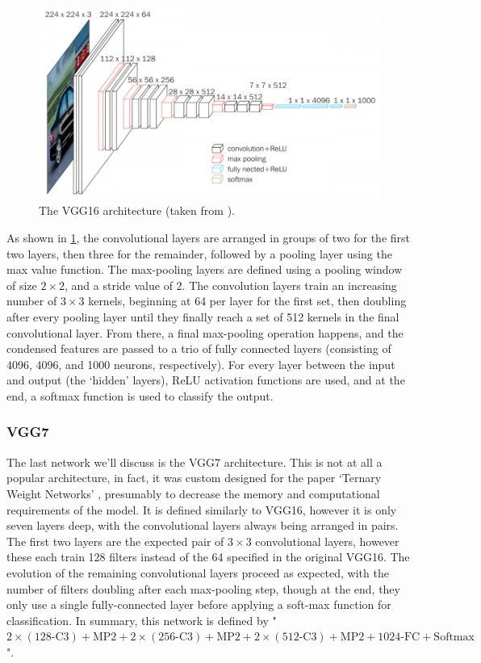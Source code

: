 \documentclass[11pt,a4paper,oldfontcommands]{memoir}
\begin{document}
\begin{figure}
    \centering
    \includegraphics[width=40em]{Images/VGG16.png}
    \caption{The VGG16 architecture (taken from \cite{VGG16_graphic}).}
    \label{fig:VGG16_architecture}
\end{figure}

As shown in \ref{fig:VGG16_architecture}, the convolutional layers are arranged in groups of two for the first two layers, then three for the remainder, followed by a pooling layer using the max value function. The max-pooling layers are defined using a pooling window of size $2 \times 2$, and a stride value of 2. The convolution layers train an increasing number of $3 \times 3$ kernels, beginning at 64 per layer for the first set, then doubling after every pooling layer until they finally reach a set of 512 kernels in the final convolutional layer. From there, a final max-pooling operation happens, and the condensed features are passed to a trio of fully connected layers (consisting of 4096, 4096, and 1000 neurons, respectively). For every layer between the input and output (the `hidden' layers), ReLU activation functions are used, and at the end, a softmax function is used to classify the output.

\subsubsection{VGG7}
\label{sss:VGG7}
The last network we'll discuss is the VGG7 architecture. This is not at all a popular architecture, in fact, it was custom designed for the paper `Ternary Weight Networks' \cite{ternary}, presumably to decrease the memory and computational requirements of the model. It is defined similarly to VGG16, however it is only seven layers deep, with the convolutional layers always being arranged in pairs. The first two layers are the expected pair of $3 \times 3$ convolutional layers, however these each train 128 filters instead of the 64 specified in the original VGG16. The evolution of the remaining convolutional layers proceed as expected, with the number of filters doubling after each max-pooling step, though at the end, they only use a single fully-connected layer before applying a soft-max function for classification. In summary, this network is defined by "$2 \times (\textrm{128-C3}) + \textrm{MP2} + 2 \times (\textrm{256-C3}) + \textrm{MP2} + 2 \times (\textrm{512-C3}) + \textrm{MP2} + \textrm{1024-FC} + \textrm{Softmax}$".  
\end{document}
